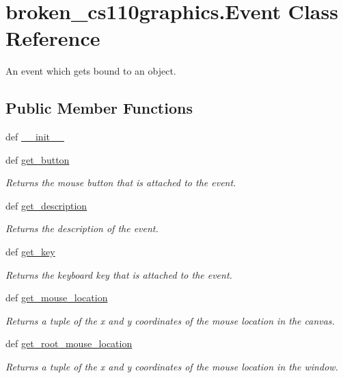 \hypertarget{classbroken__cs110graphics_1_1Event}{
\section{broken\_\-cs110graphics.Event Class Reference}
\label{classbroken__cs110graphics_1_1Event}
}


An event which gets bound to an object.  
\subsection*{Public Member Functions}
\begin{DoxyCompactItemize}
\item 
def \hyperlink{classbroken__cs110graphics_1_1Event_a45e8fa8a01a5e575df29be5f00447170}{\_\-\_\-init\_\-\_\-}
\item 
def \hyperlink{classbroken__cs110graphics_1_1Event_a942d58ca72c232b00a24a81a7ad6aa95}{get\_\-button}
\begin{DoxyCompactList}\small\item\em Returns the mouse button that is attached to the event. \item\end{DoxyCompactList}\item 
def \hyperlink{classbroken__cs110graphics_1_1Event_a47c288b956b80e4670efe13d68aeb72b}{get\_\-description}
\begin{DoxyCompactList}\small\item\em Returns the description of the event. \item\end{DoxyCompactList}\item 
def \hyperlink{classbroken__cs110graphics_1_1Event_a92e6643c15f663845f0615eb40a6e72c}{get\_\-key}
\begin{DoxyCompactList}\small\item\em Returns the keyboard key that is attached to the event. \item\end{DoxyCompactList}\item 
def \hyperlink{classbroken__cs110graphics_1_1Event_a7db9cf2e411a07713a6327bd27c73658}{get\_\-mouse\_\-location}
\begin{DoxyCompactList}\small\item\em Returns a tuple of the x and y coordinates of the mouse location in the canvas. \item\end{DoxyCompactList}\item 
def \hyperlink{classbroken__cs110graphics_1_1Event_ada40290d45fbb9d296f695e5d9760b65}{get\_\-root\_\-mouse\_\-location}
\begin{DoxyCompactList}\small\item\em Returns a tuple of the x and y coordinates of the mouse location in the window. \item\end{DoxyCompactList}\end{DoxyCompactItemize}



